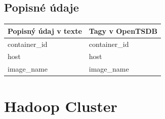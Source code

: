 \documentclass[printed,11pt,twoside,color,cover,table]{fithesis3}
\begin{document}
\subsection{Popisné údaje}
\begin{center}
     \begin{tabular}{| l | l |}
    \hline
    Popisný údaj v texte & Tagy v OpenTSDB \\ \hline
    container\_id & container\_id\\ \hline
    host & host\\ \hline
    image\_name & image\_name\\ \hline
    \end{tabular}
\end{center}

\section{Hadoop Cluster}
\end{document}
